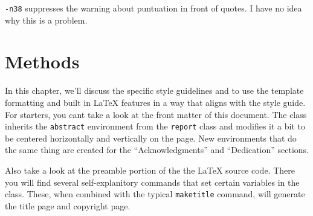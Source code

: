 \documentclass{thesis-dissertation}
\begin{document}
\texttt{-n38} suppresses the warning about puntuation in front of quotes. I have no idea why this is a problem.
\chapter{Methods}

In this chapter, we'll discuss the specific style guidelines and to use the template formatting and built in \LaTeX{} features in a way that aligns with the style guide. For starters, you cant take a look at the front matter of this document. The class inherits the \texttt{abstract} environment from the \texttt{report} class and modifies it a bit to be centered horizontally and vertically on the page. New environments that do the same thing are created for the ``Acknowledgments'' and ``Dedication'' sections. 

Also take a look at the preamble portion of the the \LaTeX{} source code. There you will find several self-explanitory commands that set certain variables in the class. These, when combined with the typical \texttt{maketitle} command, will generate the title page and copyright page.
\end{document}
